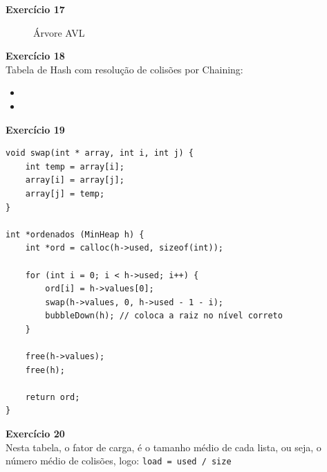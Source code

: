 \documentclass[a4paper,11pt]{article}
\begin{document}
\noindent \textbf{Exercício 17}

\begin{figure}[h]
	\centering
	\caption{Árvore AVL}
\end{figure}

\noindent \textbf{Exercício 18}\\

\noindent Tabela de Hash com resolução de colisões por Chaining:

\begin{itemize}
	\item 
	\item 
\end{itemize}

\noindent \textbf{Exercício 19}

\begin{verbatim}
void swap(int * array, int i, int j) {
	int temp = array[i];
	array[i] = array[j];
	array[j] = temp;
}

int *ordenados (MinHeap h) {
	int *ord = calloc(h->used, sizeof(int));
	
	for (int i = 0; i < h->used; i++) {
		ord[i] = h->values[0];
		swap(h->values, 0, h->used - 1 - i);
		bubbleDown(h); // coloca a raiz no nível correto
	}
	
	free(h->values);
	free(h);
	
	return ord;
}
\end{verbatim}

\noindent \textbf{Exercício 20}\\

\noindent Nesta tabela, o fator de carga, é o tamanho médio de cada lista, ou seja, o número médio de colisões, logo: \texttt{load = used / size}
\end{document}
